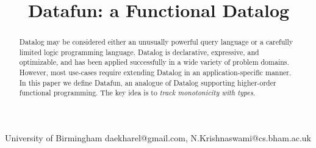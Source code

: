 \documentclass[preprint]{sigplanconf}
\begin{document}
\setlength{\pdfpageheight}{\paperheight}
\setlength{\pdfpagewidth}{\paperwidth}





\title{Datafun: a Functional Datalog}
\subtitle{}

           {University of Birmingham}
           {daekharel@gmail.com, N.Krishnaswami@cs.bham.ac.uk}

\maketitle


\begin{abstract}
  Datalog may be considered either an unusually powerful query language or a
  carefully limited logic programming language. Datalog is declarative,
  expressive, and optimizable, and has been applied successfully in a wide
  variety of problem domains. However, most use-cases require extending Datalog
  in an application-specific manner. In this paper we define Datafun, an
  analogue of Datalog supporting higher-order functional programming. The key
  idea is to \emph{track monotonicity with types}.

\end{abstract}


%
%





\end{document}
